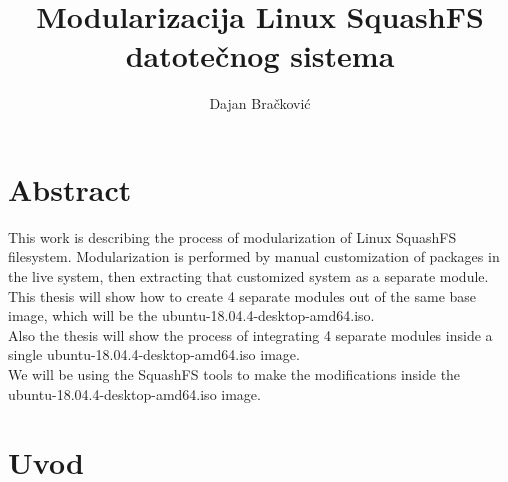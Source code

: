 \documentclass[12pt,vi]{mitthesis}
\begin{document}
\author{Dajan Bračković}
\title{Modularizacija Linux SquashFS datotečnog sistema}

\maketitle

\tableofcontents{}

\chapter*{Abstract}
\indent
This work is describing the process of modularization of Linux SquashFS filesystem. Modularization is performed by manual customization of packages in the live system, then extracting that customized system as a separate module.\\
\indent
This thesis will show how to create 4 separate modules out of the same base image, which will be the ubuntu-18.04.4-desktop-amd64.iso.\\
\indent
Also the thesis will show the process of integrating 4 separate modules inside a single ubuntu-18.04.4-desktop-amd64.iso image.\\
\indent
We will be using the SquashFS tools to make the modifications inside the ubuntu-18.04.4-desktop-amd64.iso image.

\chapter*{Uvod}
\end{document}
